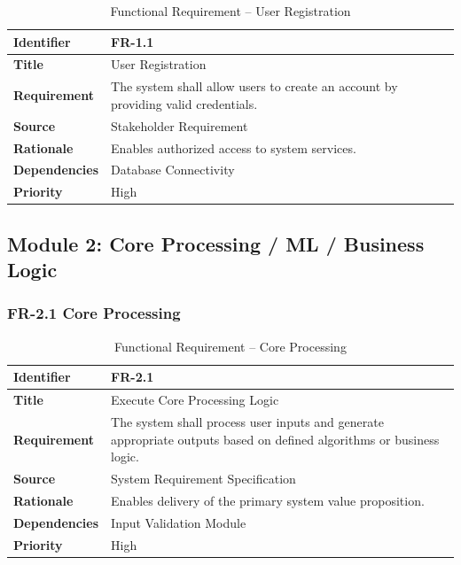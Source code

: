 \begin{table}[h]
\centering
\caption{Functional Requirement – User Registration}

\begin{tabularx}{\textwidth}{|p{3cm}|X|}
\hline
\textbf{Identifier} & FR-1.1 \\
\hline
\textbf{Title} & User Registration \\
\hline
\textbf{Requirement} & The system shall allow users to create an account by providing valid credentials. \\
\hline
\textbf{Source} & Stakeholder Requirement \\
\hline
\textbf{Rationale} & Enables authorized access to system services. \\
\hline
\textbf{Dependencies} & Database Connectivity \\
\hline
\textbf{Priority} & High \\
\hline
\end{tabularx}

\end{table}



\subsection{Module 2: Core Processing / ML / Business Logic}

\subsubsection{FR-2.1 Core Processing}

\begin{table}[h]
\centering
\caption{Functional Requirement – Core Processing}

\begin{tabularx}{\textwidth}{|p{3cm}|X|}
\hline
\textbf{Identifier} & FR-2.1 \\
\hline
\textbf{Title} & Execute Core Processing Logic \\
\hline
\textbf{Requirement} & The system shall process user inputs and generate appropriate outputs based on defined algorithms or business logic. \\
\hline
\textbf{Source} & System Requirement Specification \\
\hline
\textbf{Rationale} & Enables delivery of the primary system value proposition. \\
\hline
\textbf{Dependencies} & Input Validation Module \\
\hline
\textbf{Priority} & High \\
\hline
\end{tabularx}

\end{table}



